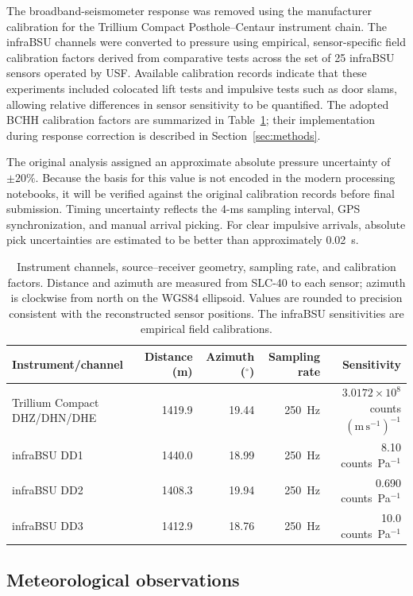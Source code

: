 \documentclass[]{seismica}
\begin{document}
The broadband-seismometer response was removed using the manufacturer
calibration for the Trillium Compact Posthole--Centaur instrument chain. The
infraBSU channels were converted to pressure using empirical, sensor-specific
field calibration factors derived from comparative tests across the set of 25
infraBSU sensors operated by USF. Available calibration records indicate that
these experiments included colocated lift tests and impulsive tests such as
door slams, allowing relative differences in sensor sensitivity to be
quantified. The adopted BCHH calibration factors are summarized in
Table~\ref{tab:instrument_calibration}; their implementation during response
correction is described in Section~\ref{sec:methods}.

The original analysis assigned an approximate absolute pressure uncertainty of
$\pm20\%$. Because the basis for this value is not encoded in the modern
processing notebooks, it will be verified against the original calibration
records before final submission. Timing uncertainty reflects the 4-ms sampling
interval, GPS synchronization, and manual arrival picking. For clear impulsive
arrivals, absolute pick uncertainties are estimated to be better than
approximately 0.02~s.

\begin{table}[t]
\centering
\caption{Instrument channels, source--receiver geometry, sampling rate, and
calibration factors. Distance and azimuth are measured from SLC-40 to each
sensor; azimuth is clockwise from north on the WGS84 ellipsoid. Values are
rounded to precision consistent with the reconstructed sensor positions. The
infraBSU sensitivities are empirical field calibrations.}
\label{tab:instrument_calibration}
\begin{tabular}{lrrrr}
\hline
Instrument/channel & Distance (m) & Azimuth ($^\circ$) & Sampling rate & Sensitivity \\
\hline
Trillium Compact DHZ/DHN/DHE
  & 1419.9 & 19.44 & 250~Hz
  & $3.0172\times10^8$ counts $(\mathrm{m\,s^{-1}})^{-1}$ \\
infraBSU DD1
  & 1440.0 & 18.99 & 250~Hz
  & 8.10 counts~Pa$^{-1}$ \\
infraBSU DD2
  & 1408.3 & 19.94 & 250~Hz
  & 0.690 counts~Pa$^{-1}$ \\
infraBSU DD3
  & 1412.9 & 18.76 & 250~Hz
  & 10.0 counts~Pa$^{-1}$ \\
\hline
\end{tabular}
\end{table}


\subsection{Meteorological observations}
\end{document}
